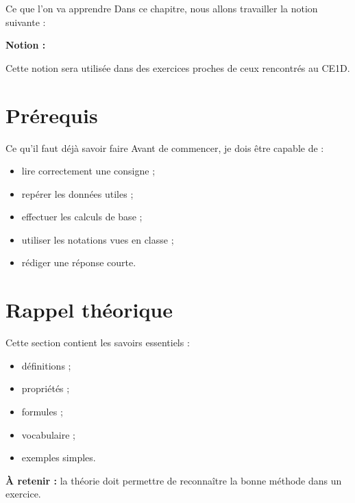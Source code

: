 \documentclass[11pt,a4paper]{article}
\begin{document}
\begin{cadregris}{Ce que l’on va apprendre}
Dans ce chapitre, nous allons travailler la notion suivante :

\medskip

\textbf{Notion :} \dotfill

\medskip

Cette notion sera utilisée dans des exercices proches de ceux rencontrés au CE1D.
\end{cadregris}

\section{Prérequis}

\begin{cadregris}{Ce qu’il faut déjà savoir faire}
Avant de commencer, je dois être capable de :
\begin{itemize}
    \item lire correctement une consigne ;
    \item repérer les données utiles ;
    \item effectuer les calculs de base ;
    \item utiliser les notations vues en classe ;
    \item rédiger une réponse courte.
\end{itemize}
\end{cadregris}

\section{Rappel théorique}

\begin{cadretheorie}
Cette section contient les savoirs essentiels :

\begin{itemize}
    \item définitions ;
    \item propriétés ;
    \item formules ;
    \item vocabulaire ;
    \item exemples simples.
\end{itemize}

\medskip

\textbf{À retenir :} la théorie doit permettre de reconnaître la bonne méthode dans un exercice.
\end{cadretheorie}
\end{document}

